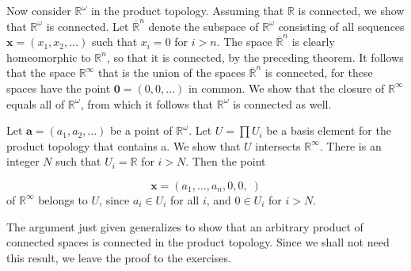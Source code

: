 \begin{centeredblock}
\begin{example}
\label{ex:\thesection.\theexample}
 Now consider \(\mathbb{R}^{\omega }\) in the product topology. Assuming that \(\mathbb{R}\) is connected, we show that \(\mathbb{R}^{\omega }\) is connected. Let \({\overline{\mathbb{R}}}^{n}\) denote the subspace of \(\mathbb{R}^{\omega }\) consisting of all sequences \(\mathbf{x} = ( {x_{1},x_{2},\ldots })\) such that \(x_{i} = 0\) for \(i > n\). The space \({\overline{\mathbb{R}}}^{n}\) is clearly homeomorphic to \(\mathbb{R}^{n}\), so that it is connected, by the preceding theorem. It follows that the space \(\mathbb{R}^{\infty }\) that is the union of the spaces \({\overline{\mathbb{R}}}^{n}\) is connected, for these spaces have the point \(\mathbf{0} = ( {0,0,\ldots })\) in common. We show that the closure of \(\mathbb{R}^{\infty }\) equals all of \(\mathbb{R}^{\omega }\), from which it follows that \(\mathbb{R}^{\omega }\) is connected as well.

Let \(\mathbf{a} = ( {a_{1},a_{2},\ldots })\) be a point of \(\mathbb{R}^{\omega }\). Let \(U = \prod {U}_{i}\) be a basis element for the product topology that contains a. We show that \(U\) intersects \(\mathbb{R}^{\infty }\). There is an integer \(N\) such that \(U_{i} = \mathbb{R}\) for \(i > N\). Then the point

\[
\mathbf{x} = ( {a_{1},\ldots ,a_{n},0,0,\;})
\]
of \(\mathbb{R}^{\infty }\) belongs to \(U\), since \(a_{i} \in {U}_{i}\) for all \(i\), and \(0 \in {U}_{i}\) for \(i > N\).
\end{example}
\end{centeredblock}

The argument just given generalizes to show that an arbitrary product of connected spaces is connected in the product topology. Since we shall not need this result, we leave the proof to the exercises.

